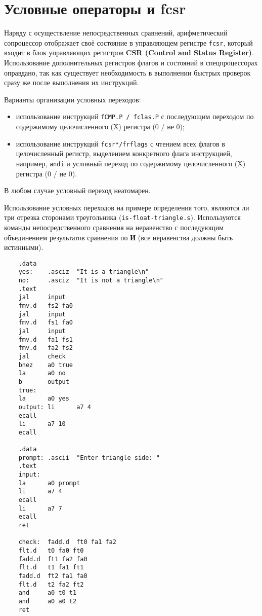 
\section{Условные операторы и fcsr}

Наряду с осуществление непосредственных сравнений, арифметический сопроцессор отображает своё состояние в управляющем регистре \verb|fcsr|, который входит в блок управляющих регистров \textbf{CSR (Control and Status Register)}. Использование дополнительных регистров флагов и состояний в спецпроцессорах оправдано, так как существует необходимость в выполнении быстрых проверок сразу же после выполнения их инструкций.

Варианты организации условных переходов:
\begin{itemize}
    \item использование инструкций \verb|fCMP.P / fclas.P| с последующим переходом по содержимому целочисленного (X) регистра (0 / не 0);
    \item использование инструкций \verb|fcsr*/frflags| с чтением всех флагов в целочисленный регистр, выделением конкретного флага инструкцией, например, \verb|andi| и условный переход по содержимому целочисленного (X) регистра (0 / не 0).
\end{itemize}
В любом случае условный переход неатомарен.

Использование условных переходов на примере определения того, являются ли три отрезка сторонами треугольника (\verb|is-float-triangle.s|). Используются команды непосредственного сравнения на неравенство с последующим объединением результатов сравнения по \textbf{И} (все неравенства должны быть истинными).

\begin{verbatim}
    .data
    yes:    .asciz  "It is a triangle\n"
    no:     .asciz  "It is not a triangle\n"
    .text
    jal     input
    fmv.d   fs2 fa0
    jal     input
    fmv.d   fs1 fa0
    jal     input
    fmv.d   fa1 fs1
    fmv.d   fa2 fs2
    jal     check
    bnez    a0 true
    la      a0 no
    b       output
    true:
    la      a0 yes
    output: li      a7 4
    ecall
    li      a7 10
    ecall

    .data
    prompt: .ascii  "Enter triangle side: "
    .text
    input:
    la      a0 prompt
    li      a7 4
    ecall
    li      a7 7
    ecall
    ret

    check:  fadd.d  ft0 fa1 fa2
    flt.d   t0 fa0 ft0
    fadd.d  ft1 fa2 fa0
    flt.d   t1 fa1 ft1
    fadd.d  ft2 fa1 fa0
    flt.d   t2 fa2 ft2
    and     a0 t0 t1
    and     a0 a0 t2
    ret
\end{verbatim}

